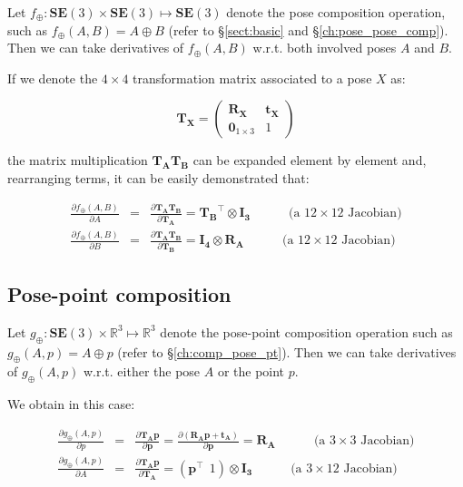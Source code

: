 \documentclass[a4paper,11pt]{report}
\begin{document}
Let $f_\oplus: \mathbf{SE}(3) \times \mathbf{SE}(3) \mapsto \mathbf{SE}(3)$ denote
the pose composition operation,
such as $f_\oplus(A,B) = A \oplus B$
(refer to \S\ref{sect:basic} and \S\ref{ch:pose_pose_comp}).
Then we can take derivatives of $f_\oplus(A,B)$ w.r.t. both involved poses $A$ and $B$.

If we denote the $4 \times 4$ transformation matrix associated to a pose $X$ as:

\begin{equation}
 \mathbf{T_X} =
\left(
\begin{array}{c|c}
  \mathbf{R_X} & \mathbf{t_X} \\
\hline
  \mathbf{0}_{1\times 3} & 1
\end{array}
\right)
\end{equation}

\noindent the matrix multiplication $\mathbf{T_A}\mathbf{T_B}$ can be
expanded element by element and, rearranging terms, it can be easily demonstrated that:

\begin{eqnarray}
\frac{\partial f_\oplus(A,B) }{\partial A } &=&
\frac{\partial \mathbf{T_A}\mathbf{T_B} }{\partial \mathbf{T_A} } = \mathbf{T_B}^\top \otimes \mathbf{I_3}
\quad \quad \quad
\text{(a $12 \times 12$ Jacobian)}
\\
\frac{\partial f_\oplus(A,B) }{\partial B } &=&
\frac{\partial \mathbf{T_A}\mathbf{T_B} }{\partial \mathbf{T_B} } =
\mathbf{I_4} \otimes   \mathbf{R_A}
\quad \quad \quad
\text{(a $12 \times 12$ Jacobian)}
\end{eqnarray}


\subsection{Pose-point composition}

Let $g_\oplus: \mathbf{SE}(3) \times \mathbb{R}^3 \mapsto \mathbb{R}^3$ denote
the pose-point composition operation
such as $g_\oplus(A,p) = A \oplus p$
(refer to \S\ref{ch:comp_pose_pt}).
Then we can take derivatives of $g_\oplus(A,p)$ w.r.t. either the pose $A$ or the point $p$.

We obtain in this case:

\begin{eqnarray}
\label{eq:jac_dAp_p}
\frac{\partial g_\oplus(A,p) }{\partial p } &=&
\frac{\partial \mathbf{T_A}\mathbf{p} }{\partial \mathbf{p} } =
\frac{\partial (\mathbf{R_A}\mathbf{p} + \mathbf{t_A})}{\partial \mathbf{p} } =
\mathbf{R_A}
\quad \quad \quad
\text{(a $3 \times 3$ Jacobian)}
\\
\label{eq:jac_dAp_A}
\frac{\partial g_\oplus(A,p) }{\partial A } &=&
\frac{\partial \mathbf{T_A}\mathbf{p} }{\partial \mathbf{T_A} } =
\left( \mathbf{p}^\top ~~ 1 \right) \otimes \mathbf{I_3}
\quad \quad \quad
\text{(a $3 \times 12$ Jacobian)}
\end{eqnarray}
\end{document}
